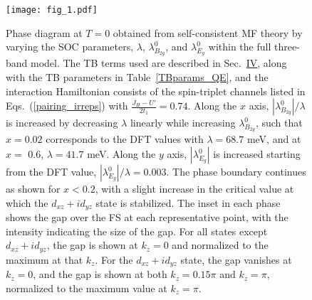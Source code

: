 \documentclass[%
reprint,
superscriptaddress,
 amsmath,amssymb,
 aps,
prb,
nobalancelastpage,
]{revtex4-2}
\begin{document}






\begin{figure}[t!]
\texttt{[image: fig\_1.pdf]}%
\caption{\label{fig1} Phase diagram at $T=0$ obtained from self-consistent MF theory by varying the SOC parameters, $\lambda$, $\lambda_{B_{2g}}^{0}$, and $\lambda_{E_{g}}^{0}$ within the full three-band model. The TB terms used are described in Sec.~\hyperref[Four]{IV}, along with the TB parameters in Table~\ref{TBparams_QE}, and the interaction Hamiltonian consists of the spin-triplet channels listed in Eqs.~(\ref{pairing_irreps}) with $\frac{J_{H}-U'}{2t_{1}}=0.74$. Along the $x$ axis, $|\lambda_{B_{2g}}^{0}|/\lambda$ is increased by decreasing $\lambda$ linearly while increasing $\lambda_{B_{2g}}^{0}$, such that $x=0.02$ corresponds to the DFT values with $\lambda=68.7$ meV, and at $x=$ 0.6, $\lambda=41.7$ meV. Along the $y$ axis, $|\lambda_{E_{g}}^{0}|$ is increased starting from the DFT value, $|\lambda_{E_{g}}^{0}|/\lambda=0.003$. The phase boundary continues as shown for $x<0.2$, with a slight increase in the critical value at which the $d_{xz}+id_{yz}$ state is stabilized. The inset in each phase shows the gap over the FS at each representative point, with the intensity indicating the size of the gap. For all states except $d_{xz}+id_{yz}$, the gap is shown at $k_{z}=0$ and normalized to the maximum at that $k_{z}$. For the $d_{xz}+id_{yz}$ state, the gap vanishes at $k_{z}=0$, and the gap is shown at both $k_{z}=0.15\pi$ and $k_{z}=\pi$, normalized to the maximum value at $k_{z}=\pi$.}
\end{figure}
\end{document}
